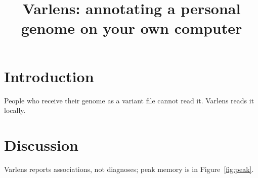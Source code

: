 \documentclass{article}
\title{Varlens: annotating a personal genome on your own computer}
\begin{document}
\maketitle

\section{Introduction}
People who receive their genome as a variant file cannot read it. Varlens reads it locally.



\section{Discussion}
Varlens reports associations, not diagnoses; peak memory is in Figure~\ref{fig:peak}.
\end{document}
